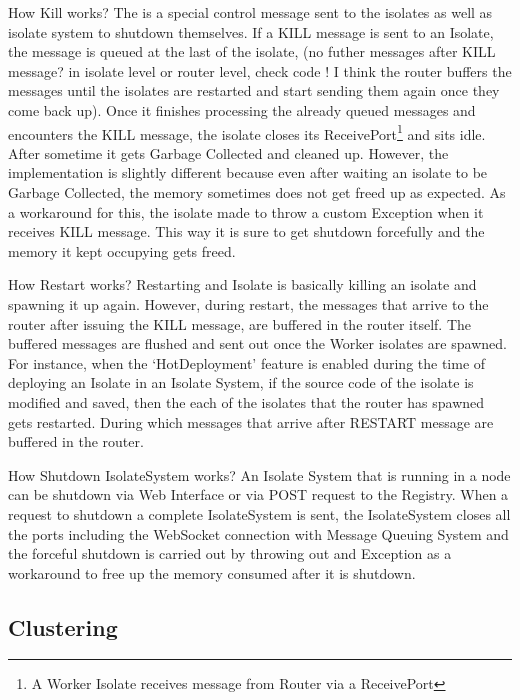 \begin{description}
    \item How Kill works?
    The is a special control message sent to the isolates as well as isolate system to shutdown themselves. If a KILL message is sent to an Isolate, the message is queued at the last of the isolate, (no futher messages after KILL message? in isolate level or router level, check code ! I think the router buffers the messages until the isolates are restarted and start sending them again once they come back up). Once it finishes processing the already queued messages and encounters the KILL message, the isolate closes its ReceivePort\footnote{A Worker Isolate receives message from Router via a ReceivePort} and sits idle. After sometime it gets Garbage Collected and cleaned up. However, the implementation is slightly different because even after waiting an isolate to be Garbage Collected, the memory sometimes does not get freed up as expected. As a workaround for this, the isolate made to throw a custom Exception when it receives KILL message. This way it is sure to get shutdown forcefully and the memory it kept occupying gets freed.

    \item How Restart works?
    Restarting and Isolate is basically killing an isolate and spawning it up again. However, during restart, the messages that arrive to the router after issuing the KILL message, are buffered in the router itself. The buffered messages are flushed and sent out once the Worker isolates are spawned. For instance, when the ‘HotDeployment’ feature is enabled during the time of deploying an Isolate in an Isolate System, if the source code of the isolate is modified and saved, then the each of the isolates that the router has spawned gets restarted. During which messages that arrive after RESTART message are buffered in the router.

    \item How Shutdown IsolateSystem works?
    An Isolate System that is running in a node can be shutdown via Web Interface or via POST request to the Registry. When a request to shutdown a complete IsolateSystem is sent, the IsolateSystem closes all the ports including the WebSocket connection with Message Queuing System and the forceful shutdown is carried out by throwing out and Exception as a workaround to free up the memory consumed after it is shutdown.

  \end{description}
\subsection{Clustering}



